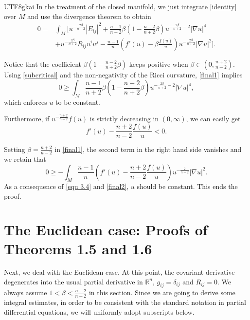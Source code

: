 \documentclass[reqno,12pt]{amsart}
\numberwithin{equation}{section}
\newcommand{\bR}{{\mathbb R}}  %
\begin{document}
\begin{CJK}{UTF8}{gkai}
  In the treatment of the closed manifold, we just integrate \eqref{identity} over $M$ and use the divergence theorem to obtain
  \begin{equation}\label{final1}
      \begin{aligned}
      		0=&\int_{M}\Big[u^{-\frac{2\beta}{n+2}}|E_{ij}|^{2}+\frac{n-1}{n+2}\beta\left(1-\frac{n-2}{n+2}\beta\right)u^{-\frac{2\beta}{n+2}-2}|\nabla u|^{4}\\
      		&+u^{-\frac{2\beta}{n+2}}R_{ij}u^{i}u^{j}-\frac{n-1}{n}\left(f'(u)-\beta\frac{f(u)}{u}\right)u^{-\frac{2\beta}{n+2}}|\nabla u|^{2} \Big].
      \end{aligned}
   \end{equation}
   
   Notice that the coefficient $\beta\left(1-\frac{n-2}{n+2}\beta\right)$ keeps positive when $\beta\in (0,\frac{n+2}{n-2})$. Using \eqref{subcritical}  and the non-negativity of the Ricci curvature, \eqref{final1} implies
   \begin{equation}
   	0\ge \int_{M} \frac{n-1}{n+2}\beta\left(1-\frac{n-2}{n+2}\beta\right)u^{-\frac{2\beta}{n+2}-2}|\nabla u|^{4},
   \end{equation}
   which enforces $u$ to be constant.
   
   Furthermore, if $u^{-\frac{n+2}{n-2}}f(u)$ is strictly decreasing in $(0,\infty)$, we can easily get
   \begin{equation}\label{equ 3.4}
   	f'(u)-\frac{n+2}{n-2}\frac{f(u)}{u}<0.
   \end{equation}
   
   Setting $\beta=\frac{n+2}{n-2}$ in \eqref{final1}, the second term in the right hand side vanishes and we retain that
   \begin{equation}\label{final2}
   	0\ge -\int_{M} \frac{n-1}{n}\left(f'(u)-\frac{n+2}{n-2}\frac{f(u)}{u}\right)u^{-\frac{2}{n-2}}|\nabla u|^{2} .
   \end{equation}
   As a consequence of \eqref{equ 3.4} and \eqref{final2}, $u$ should be constant.  This ends the proof.
   \section{The Euclidean case: Proofs of Theorems 1.5 and  1.6}
   Next, we deal with the Euclidean case. At this point, the covariant derivative degenerates into the usual partial derivative in $\bR^{n}$, $g_{ij}=\delta_{ij}$ and $R_{ij}=0$. We always assume  $1< \beta<\frac{n+2}{n-2}$ in this section. Since we are going to derive some integral estimates, in order to be consistent with the standard notation in partial differential equations, we will uniformly adopt subscripts below.

\end{CJK}
\end{document}
